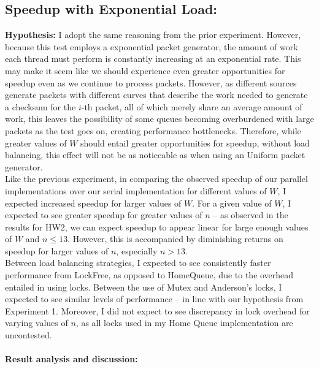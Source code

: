 \documentclass[]{article}
\begin{document}
\subsection{Speedup with Exponential Load:}
\textbf{Hypothesis:}
I adopt the same reasoning from the prior experiment. However, because this test employs a exponential packet generator, the amount of work each thread must perform is constantly increasing at an exponential rate. This may make it seem like we should experience even greater opportunities for speedup even as we continue to process packets. However, as different sources generate packets with different curves that describe the work needed to generate a checksum for the $i$-th packet, all of which merely share an average amount of work, this leaves the possibility of some queues becoming overburdened with large packets as the test goes on, creating performance bottlenecks. Therefore, while greater values of $W$ should entail greater opportunities for speedup, without load balancing, this effect will not be as noticeable as when using an Uniform packet generator.
\\
Like the previous experiment, in comparing the observed speedup of our parallel implementations over our serial implementation for different values of $W$, I expected increased speedup for larger values of $W$. For a given value of $W$, I expected to see greater speedup for greater values of $n$ -- as observed in the results for HW2, we can expect speedup to appear linear for large enough values of $W$ and $n \leq 13$. However, this is accompanied by diminishing returns on speedup for larger values of $n$, especially $n > 13$.
\\
Between load balancing strategies, I expected to see consistently faster performance from LockFree, as opposed to HomeQueue, due to the overhead entailed in using locks. Between the use of Mutex and Anderson's locks, I expected to see similar levels of performance -- in line with our hypothesis from Experiment 1. Moreover, I did not expect to see discrepancy in lock overhead for varying values of $n$, as all locks used in my Home Queue implementation are uncontested. %
\\\\
\textbf{Result analysis and discussion:}
\end{document}
